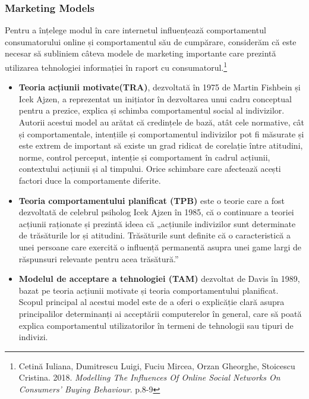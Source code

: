 \documentclass[a4paper, 12pt]{article}
\begin{document}
			\subsubsection{Marketing Models}		
			\qquad Pentru a înțelege modul în care internetul influențează comportamentul consumatorului online și comportamentul său de cumpărare, considerăm că este necesar să subliniem câteva modele de marketing importante care prezintă utilizarea tehnologiei informației în raport cu consumatorul.\footnote{Cetină Iuliana, Dumitrescu Luigi, Fuciu Mircea, Orzan Gheorghe, Stoicescu Cristina.	2018. \textit{Modelling The Influences Of Online Social Networks On Consumers' Buying Behaviour}. p.8-9}
			\begin{itemize}
				\item \textbf{Teoria acțiunii motivate(TRA)}, dezvoltată în 1975 de Martin Fishbein și Icek Ajzen, a reprezentat un inițiator în dezvoltarea unui cadru conceptual pentru a prezice, explica și schimba comportamentul social al indivizilor. Autorii acestui model au arătat că credințele de bază, atât cele normative, cât și comportamentale, intențiile și comportamentul indivizilor pot fi măsurate și este extrem de important să existe un grad ridicat de corelație între atitudini, norme, control perceput, intenție și comportament în cadrul acțiunii, contextului acțiunii și al timpului. Orice schimbare care afectează acești factori duce la comportamente diferite.
				\item \textbf{Teoria comportamentului planificat (TPB)} este o teorie care a fost dezvoltată de celebrul psiholog Icek Ajzen în 1985, că o continuare a teoriei acțiunii raționate și prezintă ideea că „acțiunile indivizilor sunt determinate de trăsăturile lor și atitudini. Trăsăturile sunt definite că o caracteristică a unei persoane care exercită o influență permanentă asupra unei game largi de răspunsuri relevante pentru acea trăsătură.”
				\item \textbf{Modelul de acceptare a tehnologiei (TAM)} dezvoltat de Davis în 1989, bazat pe teoria acțiunii motivate și teoria comportamentului planificat. Scopul principal al acestui model este de a oferi o explicăție clară asupra principalilor determinanți ai acceptării computerelor în general, care să poată explica comportamentul utilizatorilor în termeni de tehnologii sau tipuri de indivizi.
			\end{itemize}
			
\end{document}
